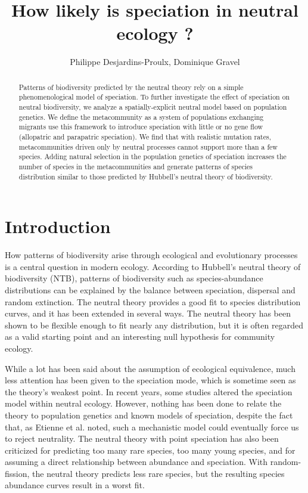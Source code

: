 \documentclass[letterpaper,twocolumn,showkeys]{revtex4-1}
\begin{document}
\title{How likely is speciation in neutral ecology ?}

\author{Philippe Desjardins-Proulx, Dominique Gravel}

\begin{abstract} 
Patterns of biodiversity predicted by the neutral theory rely on a simple
phenomenological model of speciation. To further investigate the effect of
speciation on neutral biodiversity, we analyze a spatially-explicit neutral
model based on population genetics. We define the metacommunity as a system of
populations exchanging migrants use this framework to introduce speciation with
little or no gene flow (allopatric and parapatric speciation). We find that with
realistic mutation rates, metacommunities driven only by neutral processes
cannot support more than a few species. Adding natural selection in the
population genetics of speciation increases the number of species in the
metacommunities and generate patterns of species distribution similar to those
predicted by Hubbell's neutral theory of biodiversity.
\end{abstract}


\maketitle

\section{Introduction}

How patterns of biodiversity arise through ecological and evolutionary
processes is a central question in modern ecology. According to Hubbell's
neutral theory of biodiversity (NTB), patterns of biodiversity such as
species-abundance distributions can be explained by the balance between
speciation, dispersal and random extinction. The neutral theory provides a
good fit to species distribution curves, and it has been extended in several
ways. The neutral theory has been shown to be flexible enough to fit nearly
any distribution, but it is often regarded as a valid starting point and an
interesting null hypothesis for community ecology.

While a lot has been said about the assumption of ecological equivalence, much
less attention has been given to the speciation mode, which is sometime seen
as the theory's weakest point. In recent years, some studies altered the
speciation model within neutral ecology. However, nothing has been done to
relate the theory to population genetics and known models of speciation,
despite the fact that, as Etienne et al. noted, such a mechanistic model could
eventually force us to reject neutrality. The neutral theory with point
speciation has also been criticized for predicting too many rare species, too
many young species, and for assuming a direct relationship between abundance
and speciation. With random-fission, the neutral theory predicts less rare
species, but the resulting species abundance curves result in a worst fit.
\end{document}
